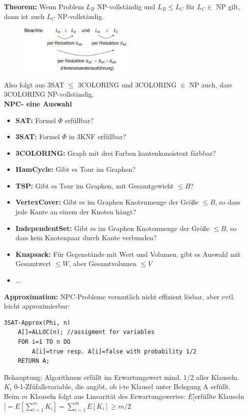 \documentclass{article}
\begin{document}
                \textbf{Theorem:} Wenn Problem $L_B$ NP-vollständig und $L_B \leq L_C$ für $L_C\in$ NP gilt, dann ist auch $L_C$ NP-vollständig.\\
                \begin{figure}[ht]
                    \centering
                    \includegraphics[width=0.5\textwidth]{Bilder/EFAAFE.png}
                    \caption{ }
                    \label{fig:EFAAFE}
                \end{figure}
                \newpage
                Also folgt aus 3SAT $\leq$ 3COLORING und 3COLORING $\in$ NP auch, dass 3COLORING NP-vollständig.\\
                \textbf{NPC- eine Auswahl}
                \begin{itemize}
                    \item \textbf{SAT:} Formel $\Phi$ erfüllbar?
                    \item \textbf{3SAT:} Formel $\Phi$ in 3KNF erfüllbar?
                    \item \textbf{3COLORING:} Graph mit drei Farben kantenkonsistent färbbar?
                    \item \textbf{HamCycle:} Gibt es Tour im Graphen?
                    \item \textbf{TSP:} Gibt es Tour im Graphen, mit Gesamtgewicht $\leq B$?
                    \item \textbf{VertexCover:} Gibt es im Graphen Knotenmenge der Größe $\leq B$, so dass jede Kante an einem der Knoten hängt?
                    \item \textbf{IndependentSet:} Gibt es im Graphen Knotenmenge der Größe $\leq B$, so dass kein Knotenpaar durch Kante verbunden?
                    \item \textbf{Knapsack:} Für Gegenstände mit Wert und Volumen, gibt es Auswahl mit Gesamtwert $\leq W$, aber Gesamtvolumen $\leq V$
                    \item $\dots$
                \end{itemize}
                \textbf{Approximation:} NPC-Probleme vermutlich nicht effizient lösbar, aber evtl. leicht approximierbar:\\
                \begin{lstlisting}[style=pseudocode]
3SAT-Approx(Phi, n)
    A[]=ALLOC(n); //assigment for variables
    FOR i=1 TO n DO
        A[i]=true resp. A[i]=false with probability 1/2
    RETURN A;
                \end{lstlisting}
                Behauptung: Algorithmus erfüllt im Erwartungswert mind. 1/2 aller Klauseln.\\
                $K_i$ 0-1-Zfúfallsvariable, die angibt, ob i-te Klausel unter Belegung A erfüllt.\\
                Beim $m$ Klauseln folgt aus Linearität des Erwartungswertes: $E[$erfüllte Klauseln$] = E[\sum_{i=1}^{m}K_i]=\sum_{i=1}^{m}E[K_i]\geq m/2$
\end{document}
